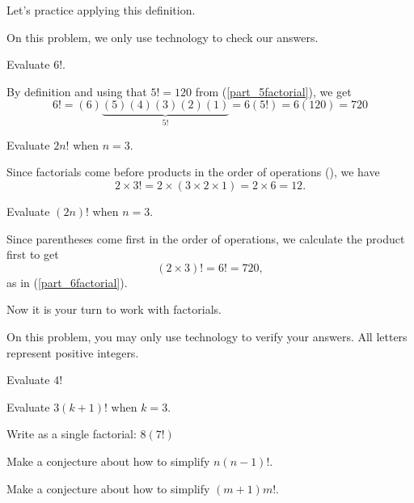 Let's practice applying this definition.

\begin{exam} [Factorials]
\label{exam_factorials}
On this problem, we only use technology to check our answers.
    \begin{apart}
        \item \label{part_6factorial} Evaluate 6!. 
            \begin{soln}
                By definition and using that $5!=120$ from (\ref{part_5factorial}), we get 
                $$6! = (6)\underbrace{(5)(4)(3)(2)(1)}_{5!} = 6(5!)= 6(120) = 720$$
            \end{soln}
        \item Evaluate $2n!$ when $n=3$.
            \begin{soln}
                Since factorials come before products in the order of operations (), we have
                $$2 \times 3! = 2 \times (3\times 2 \times 1) = 2 \times 6 = 12.$$
            \end{soln}
        \item Evaluate $(2n)!$ when $n=3$.
            \begin{soln}
                Since parentheses come first in the order of operations, we calculate the product first to get
                $$(2 \times 3)! = 6! = 720,$$
                as in (\ref{part_6factorial}).
            \end{soln}
    \end{apart}
\end{exam}

Now it is your turn to work with factorials.

\begin{act} [Factorials] 
    \label{act_factorials}  
    On this problem, you may only use technology to verify your answers. All letters represent positive integers.
    \begin{actpart}
        \item Evaluate $4!$ 
        \item Evaluate $3(k+1)!$ when $k=3$.
        \item Write as a single factorial: $8(7!)$
        \item Make a conjecture about how to simplify $n(n-1)!$.
        \item \label{part_mfactorial} Make a conjecture about how to simplify $(m+1)m!.$
    \end{actpart}
\end{act}

